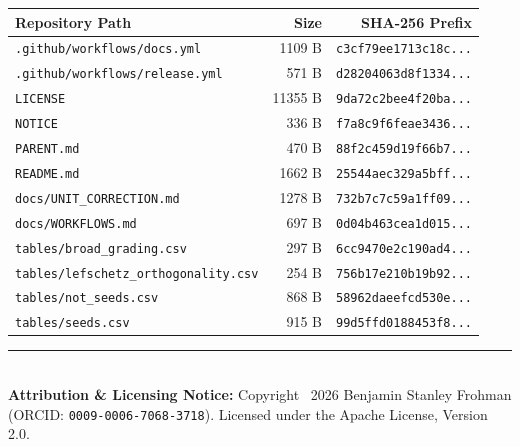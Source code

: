 \documentclass[11pt,a4paper]{article}
\begin{document}
\begin{center}
\small
\begin{tabular}{p{}rr}
\toprule
\textbf{Repository Path} & \textbf{Size} & \textbf{SHA-256 Prefix} \\
\midrule
\texttt{.github/workflows/docs.yml} & 1109 B & \texttt{c3cf79ee1713c18c...} \\
\texttt{.github/workflows/release.yml} & 571 B & \texttt{d28204063d8f1334...} \\
\texttt{LICENSE} & 11355 B & \texttt{9da72c2bee4f20ba...} \\
\texttt{NOTICE} & 336 B & \texttt{f7a8c9f6feae3436...} \\
\texttt{PARENT.md} & 470 B & \texttt{88f2c459d19f66b7...} \\
\texttt{README.md} & 1662 B & \texttt{25544aec329a5bff...} \\
\texttt{docs/UNIT\_CORRECTION.md} & 1278 B & \texttt{732b7c7c59a1ff09...} \\
\texttt{docs/WORKFLOWS.md} & 697 B & \texttt{0d04b463cea1d015...} \\
\texttt{tables/broad\_grading.csv} & 297 B & \texttt{6cc9470e2c190ad4...} \\
\texttt{tables/lefschetz\_orthogonality.csv} & 254 B & \texttt{756b17e210b19b92...} \\
\texttt{tables/not\_seeds.csv} & 868 B & \texttt{58962daeefcd530e...} \\
\texttt{tables/seeds.csv} & 915 B & \texttt{99d5ffd0188453f8...} \\
\bottomrule
\end{tabular}
\end{center}

\vfill
\noindent\rule{\textwidth}{0.4pt}\\
\footnotesize
\textbf{Attribution \& Licensing Notice:} Copyright \textcopyright\ 2026 Benjamin Stanley Frohman (ORCID: \texttt{0009-0006-7068-3718}).
Licensed under the Apache License, Version 2.0.
\end{document}

